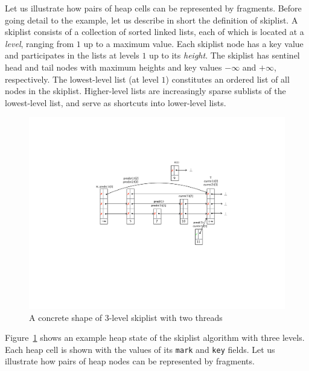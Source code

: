 Let us illustrate how pairs of heap cells can be represented by fragments. Before going detail to the example, let us describe in short the definition of skiplist. A skiplist consists of a collection of sorted linked lists, each of which is located at a {\em level}, ranging from $1$ up to a maximum value. Each skiplist node has a key value and participates in the lists at levels $1$ up to its {\em height}.
The skiplist has sentinel head and tail nodes with maximum heights and key values $-\infty$ and $+\infty$, respectively.
The lowest-level list (at level $1$) constitutes an ordered list of all nodes
in the skiplist. Higher-level lists are increasingly sparse sublists of the
lowest-level list, and serve as shortcuts into lower-level lists.
\begin{figure}
\vspace*{-0.6cm}
\center  
 \includegraphics[width=1.2\textwidth, trim={7cm 8cm 0.5cm 6cm}, clip]{skipshape.pdf}  
\vspace*{-0.6cm}
 \caption{A concrete shape of 3-level skiplist with two threads}
\label{sl-shape}
\vspace*{-0.6cm}
\end{figure}
Figure~\ref{sl-shape} shows an example heap state of the
skiplist algorithm with three levels. Each heap cell is shown with the values of its {\tt mark} and {\tt key} fields. %
Let us illustrate how pairs of heap nodes can be represented by fragments.
